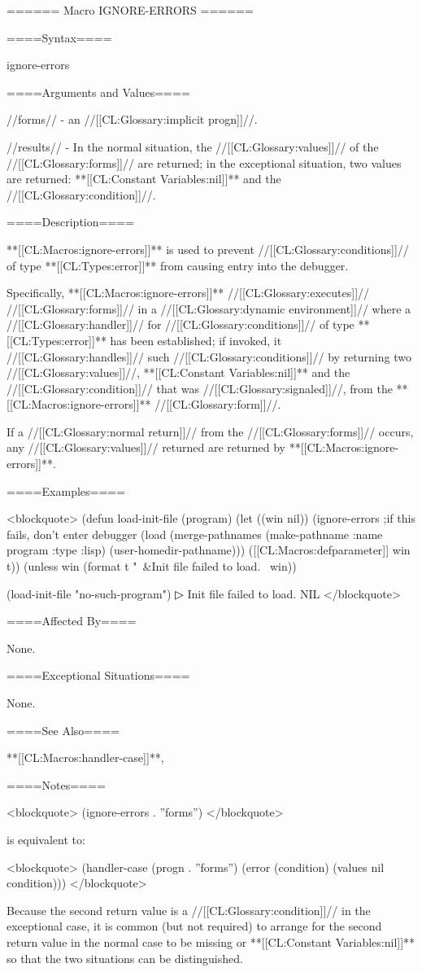 ====== Macro IGNORE-ERRORS ======

====Syntax====

\DefmacWithValues ignore-errors {} {}

====Arguments and Values====

//forms// - an //[[CL:Glossary:implicit progn]]//.

//results// - In the normal situation, the //[[CL:Glossary:values]]// of the //[[CL:Glossary:forms]]// are returned; in the exceptional situation, two values are returned: **[[CL:Constant Variables:nil]]** and the //[[CL:Glossary:condition]]//.

====Description====

**[[CL:Macros:ignore-errors]]** is used to prevent //[[CL:Glossary:conditions]]// of type **[[CL:Types:error]]** from causing entry into the debugger.

Specifically, **[[CL:Macros:ignore-errors]]** //[[CL:Glossary:executes]]// //[[CL:Glossary:forms]]// in a //[[CL:Glossary:dynamic environment]]// where a //[[CL:Glossary:handler]]// for //[[CL:Glossary:conditions]]// of type **[[CL:Types:error]]** has been established; if invoked, it //[[CL:Glossary:handles]]// such //[[CL:Glossary:conditions]]// by returning two //[[CL:Glossary:values]]//, **[[CL:Constant Variables:nil]]** and the //[[CL:Glossary:condition]]// that was //[[CL:Glossary:signaled]]//, from the **[[CL:Macros:ignore-errors]]** //[[CL:Glossary:form]]//.

If a //[[CL:Glossary:normal return]]// from the //[[CL:Glossary:forms]]// occurs, any //[[CL:Glossary:values]]// returned are returned by **[[CL:Macros:ignore-errors]]**.

====Examples====

<blockquote> (defun load-init-file (program) (let ((win nil)) (ignore-errors ;if this fails, don't enter debugger (load (merge-pathnames (make-pathname :name program :type :lisp) (user-homedir-pathname))) ([[CL:Macros:defparameter]] win t)) (unless win (format t "~&Init file failed to load.~ win))

(load-init-file "no-such-program")
▷ Init file failed to load. NIL </blockquote>

====Affected By====

None.

====Exceptional Situations====

None.

====See Also====

**[[CL:Macros:handler-case]]**, {\secref\ConditionSystemConcepts}

====Notes====

<blockquote> (ignore-errors . ''forms'') </blockquote>

is equivalent to:

<blockquote> (handler-case (progn . ''forms'') (error (condition) (values nil condition))) </blockquote>

Because the second return value is a //[[CL:Glossary:condition]]// in the exceptional case, it is common (but not required) to arrange for the second return value in the normal case to be missing or **[[CL:Constant Variables:nil]]** so that the two situations can be distinguished.


